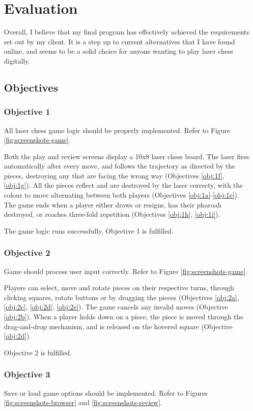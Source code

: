 \documentclass[../main/main.tex]{subfiles}
\begin{document}
\newpage
\chapter{Evaluation}
Overall, I believe that my final program has effectively achieved the requirements set out by my client. It is a step up to current alternatives that I have found online, and seems to be a solid choice for anyone wanting to play laser chess digitally.

\section{Objectives}
\subsection{Objective 1}
All laser chess game logic should be properly implemented. Refer to Figure \ref{fig:screenshots-game}.

Both the play and review screens display a 10x8 laser chess board. The laser fires automatically after every move, and follows the trajectory as directed by the pieces, destroying any that are facing the wrong way (Objectives \ref{obj:1f}, \ref{obj:1g}). All the pieces reflect and are destroyed by the laser correcty, with the colour to move alternating between both players (Objectives \ref{obj:1a}-\ref{obj:1e}). The game ends when a player either draws or resigns, has their pharoah destroyed, or reaches three-fold repetition (Objectives \ref{obj:1h}, \ref{obj:1i}).

The game logic runs successfully, Objective 1 is fulfilled.

\subsection{Objective 2}
Game should process user input correctly. Refer to Figure \ref{fig:screenshots-game}.

Players can select, move and rotate pieces on their respective turns, through clicking squares, rotate buttons or by dragging the pieces (Objectives \ref{obj:2a}, \ref{obj:2c}, \ref{obj:2d}, \ref{obj:2e}). The game cancels any invalid moves (Objective \ref{obj:2b}). When a player holds down on a piece, the piece is moved through the drag-and-drop mechanism, and is released on the hovered square (Objective \ref{obj:2d}).

Objective 2 is fulfilled.

\subsection{Objective 3}
Save or load game options should be implemented. Refer to Figures \ref{fig:screenshots-browser} and \ref{fig:screenshots-review}.
\end{document}

